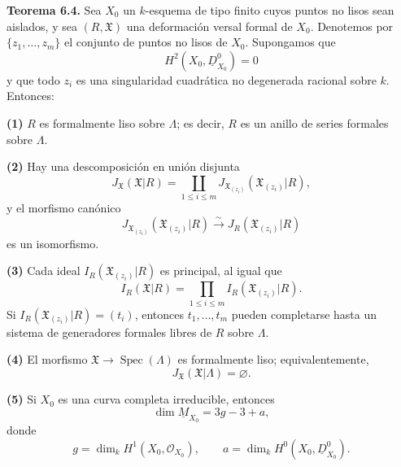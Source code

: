 \par\medskip
\noindent\textbf{Teorema 6.4.}
Sea $X_0$ un $k$-esquema de tipo finito cuyos puntos no lisos sean
aislados, y sea $(R,\mathfrak X)$ una deformación versal formal de
$X_0$. Denotemos por $\{z_1,\ldots,z_m\}$ el conjunto de puntos no
lisos de $X_0$. Supongamos que
\[
H^2(X_0,\underline D^0_{X_0})=0
\]
y que todo $z_i$ es una singularidad cuadrática no degenerada
racional sobre $k$. Entonces:

\smallskip
\noindent\textbf{(1)} $R$ es formalmente liso sobre $\Lambda$; es
decir, $R$ es un anillo de series formales sobre $\Lambda$.

\smallskip
\noindent\textbf{(2)} Hay una descomposición en unión disjunta
\[
J_{\mathfrak X}(\mathfrak X|R)
=\coprod_{1\leq i\leq m}
 J_{\mathfrak X_{(z_i)}}(\mathfrak X_{(z_i)}|R),
\]
y el morfismo canónico
\[
J_{\mathfrak X_{(z_i)}}(\mathfrak X_{(z_i)}|R)
 \xrightarrow{\ \sim\ }
J_R(\mathfrak X_{(z_i)}|R)
\]
es un isomorfismo.

\smallskip
\noindent\textbf{(3)} Cada ideal
$I_R(\mathfrak X_{(z_i)}|R)$ es principal, al igual que
\[
I_R(\mathfrak X|R)
=\prod_{1\leq i\leq m}I_R(\mathfrak X_{(z_i)}|R).
\]
Si $I_R(\mathfrak X_{(z_i)}|R)=(t_i)$, entonces
$t_1,\ldots,t_m$ pueden completarse hasta un sistema de generadores
formales libres de $R$ sobre $\Lambda$.

\smallskip
\noindent\textbf{(4)} El morfismo
$\mathfrak X\longrightarrow\operatorname{Spec}(\Lambda)$ es
formalmente liso; equivalentemente,
\[
J_{\mathfrak X}(\mathfrak X|\Lambda)=\varnothing.
\]


\smallskip
\noindent\textbf{(5)} Si $X_0$ es una curva completa irreducible,
entonces
\[
\dim\underline M_{X_0}=3g-3+a,
\]
donde
\[
g=\dim_kH^1(X_0,\mathcal O_{X_0}),
\qquad
a=\dim_kH^0(X_0,\underline D^0_{X_0}).
\]

